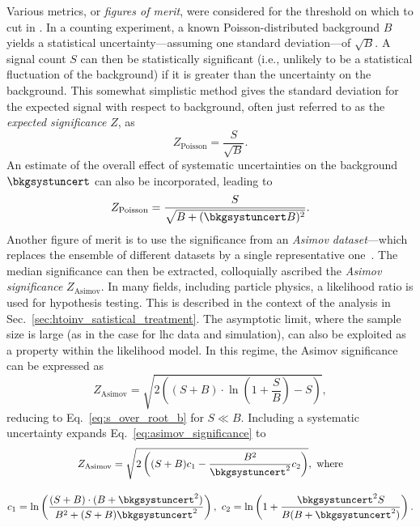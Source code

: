 Various metrics, or \emph{figures of merit}, were considered for the threshold on which to cut in \omegaTilde. In a counting experiment, a known Poisson-distributed background $B$ yields a statistical uncertainty---assuming one standard deviation---of $\sqrt{B}$. A signal count $S$ can then be statistically significant (i.e., unlikely to be a statistical fluctuation of the background) if it is greater than the uncertainty on the background. This somewhat simplistic method gives the standard deviation for the expected signal with respect to background, often just referred to as the \emph{expected significance} $Z$, as
\begin{equation}
Z_{\mathrm{Poisson}} = \frac{S}{\sqrt{B}}.
\label{eq:s_over_root_b}
\end{equation}
An estimate of the overall effect of systematic uncertainties on the background $\bkgsystuncert$ can also be incorporated, leading to
\begin{equation}
Z_{\mathrm{Poisson}} = \frac{S}{\sqrt{B + (\bkgsystuncert B)^2}}.
\label{eq:s_over_root_b_systs}
\end{equation}
Another figure of merit is to use the significance from an \emph{Asimov dataset}---which replaces the ensemble of different datasets by a single representative one~\cite{Cowan:2010js}. The median significance can then be extracted, colloquially ascribed the \emph{Asimov significance} $Z_{\mathrm{Asimov}}$. In many fields, including particle physics, a likelihood ratio is used for hypothesis testing. This is described in the context of the analysis in Sec.~\ref{sec:htoinv_satistical_treatment}. The asymptotic limit, where the sample size is large (as in the case for \acrshort{lhc} data and simulation), can also be exploited as a property within the likelihood model. In this regime, the Asimov significance can be expressed as
\begin{equation}
Z_{\mathrm{Asimov}} = \sqrt{2 \left( (S + B) \cdot \ln\left(1 + \frac{S}{B} \right) - S \right)},
\label{eq:asimov_significance}
\end{equation}
reducing to Eq.~\ref{eq:s_over_root_b} for $S \ll B$. Including a systematic uncertainty expands Eq.~\ref{eq:asimov_significance} to
\begin{equation}
    \begin{gathered}  %
Z_{\mathrm{Asimov}} = \sqrt{2 \left( (S + B) c_1 - \frac{B^2}{\bkgsystuncert^2}c_2 \right)}, \ \text{where} \\[1em]
c_1 = \ln\left( \frac{(S + B) \cdot (B + \bkgsystuncert^2)}{B^2 + (S + B)\bkgsystuncert^2} \right), \ c_2 = \ln\left( 1 + \frac{\bkgsystuncert^2 S}{B(B + \bkgsystuncert^2)} \right).
    \end{gathered}
\label{eq:asimov_significance_systs}
\end{equation}
